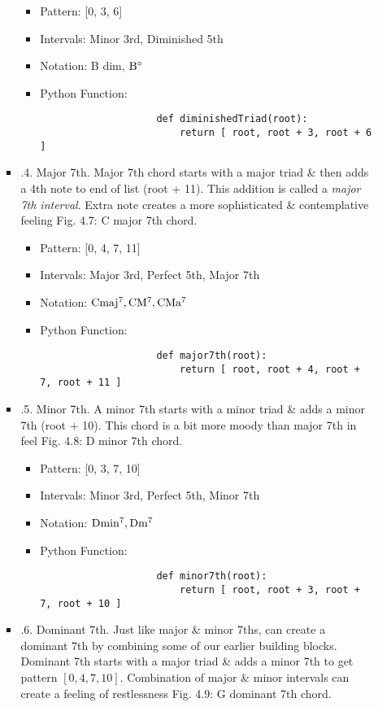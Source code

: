 \documentclass{article}
\begin{document}
\begin{itemize}
\begin{itemize}
\begin{itemize}
			\begin{itemize}
				\item Pattern: [0, 3, 6]
				\item Intervals: Minor 3rd, Diminished 5th
				\item Notation: B dim, $\rm B^\circ$
				\item Python Function:
				\begin{verbatim}
					def diminishedTriad(root):
					    return [ root, root + 3, root + 6 ]
				\end{verbatim}
			\end{itemize}
			\item {.4. Major 7th.} Major 7th chord starts with a major triad \& then adds a 4th note to end of list (root + 11). This addition is called a {\it major 7th interval}. Extra note creates a more sophisticated \& contemplative feeling {\sf Fig. 4.7: C major 7th chord.}
			\begin{itemize}
				\item Pattern: [0, 4, 7, 11]
				\item Intervals: Major 3rd, Perfect 5th, Major 7th
				\item Notation: $\rm Cmaj^7,CM^7,CMa^7$
				\item Python Function:
				\begin{verbatim}
					def major7th(root):
					    return [ root, root + 4, root + 7, root + 11 ]
				\end{verbatim}
			\end{itemize}
			\item {.5. Minor 7th.} A minor 7th starts with a minor triad \& adds a minor 7th (root + 10). This chord is a bit more moody than major 7th in feel {\sf Fig. 4.8: D minor 7th chord.}
			\begin{itemize}
				\item Pattern: [0, 3, 7, 10]
				\item Intervals: Minor 3rd, Perfect 5th, Minor 7th
				\item Notation: $\rm Dmin^7,Dm^7$
				\item Python Function:
				\begin{verbatim}
					def minor7th(root):
					    return [ root, root + 3, root + 7, root + 10 ]
				\end{verbatim}
			\end{itemize}
			\item {.6. Dominant 7th.} Just like major \& minor 7ths, can create a dominant 7th by combining some of our earlier building blocks. Dominant 7th starts with a major triad \& adds a minor 7th to get pattern $[0,4,7,10]$. Combination of major \& minor intervals can create a feeling of restlessness {\sf Fig. 4.9: G dominant 7th chord}.

\end{itemize}
\end{itemize}
\end{itemize}
\end{document}
